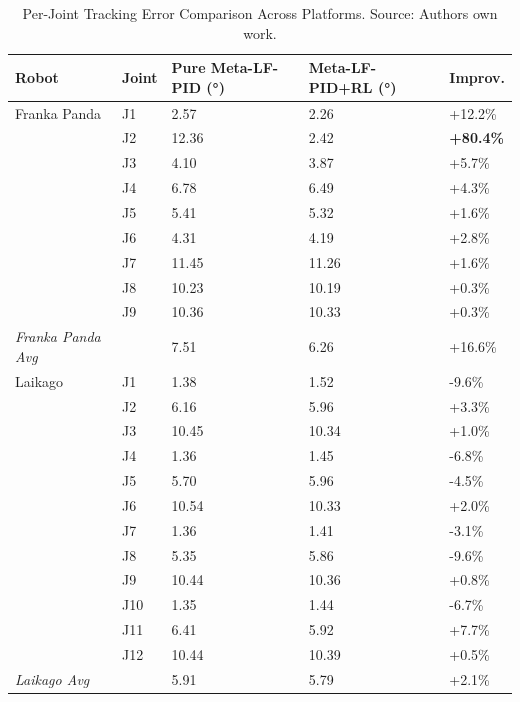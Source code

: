 \documentclass[a4paper]{cas-sc}
\begin{document}
\begin{table}[!htbp]
\caption{Per-Joint Tracking Error Comparison Across Platforms. Source: Authors own work.}
\label{tab:per_joint_error}
\begin{tabular*}{\textwidth}{@{\extracolsep{\fill}}lllll@{}}
\toprule
\textbf{Robot} & \textbf{Joint} & \textbf{Pure Meta-LF-PID (°)} & \textbf{Meta-LF-PID+RL (°)} & \textbf{Improv.} \\
\midrule
Franka Panda    & J1     &   2.57 &   2.26 & +12.2\% \\
                & J2     &  12.36 &   2.42 & \textbf{+80.4\%} \\
                & J3     &   4.10 &   3.87 &  +5.7\% \\
                & J4     &   6.78 &   6.49 &  +4.3\% \\
                & J5     &   5.41 &   5.32 &  +1.6\% \\
                & J6     &   4.31 &   4.19 &  +2.8\% \\
                & J7     &  11.45 &  11.26 &  +1.6\% \\
                & J8     &  10.23 &  10.19 &  +0.3\% \\
                & J9     &  10.36 &  10.33 &  +0.3\% \\
\midrule
\textit{Franka Panda Avg} & &   7.51 &   6.26 & +16.6\% \\
\midrule
Laikago         & J1     &   1.38 &   1.52 &  -9.6\% \\
                & J2     &   6.16 &   5.96 &  +3.3\% \\
                & J3     &  10.45 &  10.34 &  +1.0\% \\
                & J4     &   1.36 &   1.45 &  -6.8\% \\
                & J5     &   5.70 &   5.96 &  -4.5\% \\
                & J6     &  10.54 &  10.33 &  +2.0\% \\
                & J7     &   1.36 &   1.41 &  -3.1\% \\
                & J8     &   5.35 &   5.86 &  -9.6\% \\
                & J9     &  10.44 &  10.36 &  +0.8\% \\
                & J10    &   1.35 &   1.44 &  -6.7\% \\
                & J11    &   6.41 &   5.92 &  +7.7\% \\
                & J12    &  10.44 &  10.39 &  +0.5\% \\
\midrule
\textit{Laikago Avg} & &   5.91 &   5.79 &  +2.1\% \\
\bottomrule
\end{tabular*}
\end{table}
\end{document}
